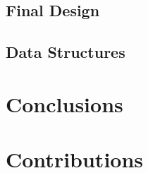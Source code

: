 \documentclass{article}
\begin{document}
\subsection{Final Design}

\subsection{Data Structures}


\section{Conclusions}

\clearpage

\section{Contributions}
\end{document}
